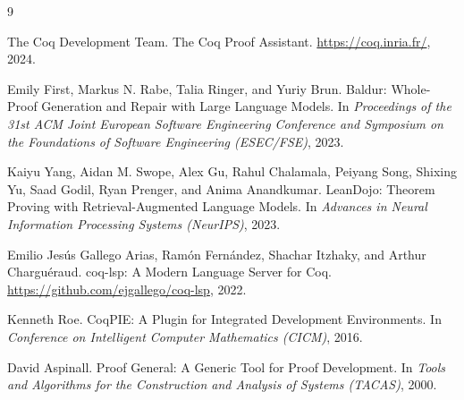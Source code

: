 \documentclass[sigconf,screen,nonacm]{acmart}
\begin{document}

\begin{thebibliography}{9}

The Coq Development Team.
\newblock The Coq Proof Assistant.
\newblock \url{https://coq.inria.fr/}, 2024.

Emily First, Markus N. Rabe, Talia Ringer, and Yuriy Brun.
\newblock Baldur: Whole-Proof Generation and Repair with Large Language Models.
\newblock In \emph{Proceedings of the 31st ACM Joint European Software Engineering Conference and Symposium on the Foundations of Software Engineering (ESEC/FSE)}, 2023.

Kaiyu Yang, Aidan M. Swope, Alex Gu, Rahul Chalamala, Peiyang Song, Shixing Yu, Saad Godil, Ryan Prenger, and Anima Anandkumar.
\newblock LeanDojo: Theorem Proving with Retrieval-Augmented Language Models.
\newblock In \emph{Advances in Neural Information Processing Systems (NeurIPS)}, 2023.

Emilio Jesús Gallego Arias, Ramón Fernández, Shachar Itzhaky, and Arthur Charguéraud.
\newblock coq-lsp: A Modern Language Server for Coq.
\newblock \url{https://github.com/ejgallego/coq-lsp}, 2022.

Kenneth Roe.
\newblock CoqPIE: A Plugin for Integrated Development Environments.
\newblock In \emph{Conference on Intelligent Computer Mathematics (CICM)}, 2016.

David Aspinall.
\newblock Proof General: A Generic Tool for Proof Development.
\newblock In \emph{Tools and Algorithms for the Construction and Analysis of Systems (TACAS)}, 2000.

\end{thebibliography}
\end{document}
